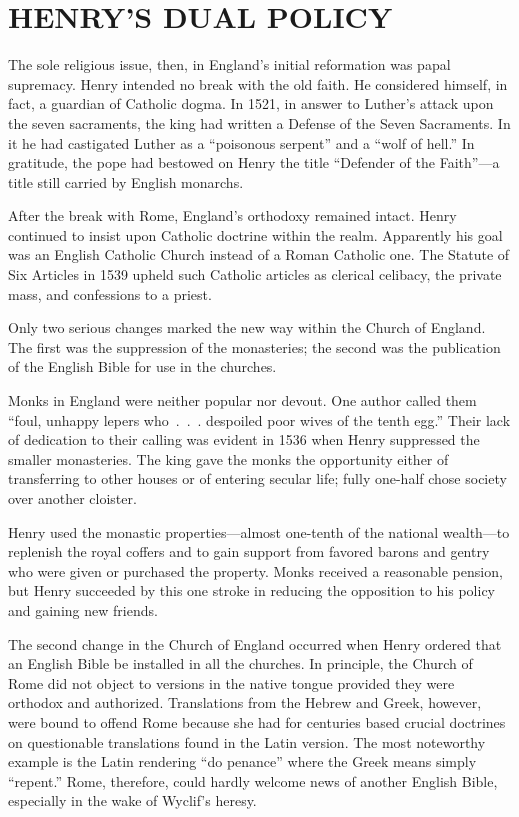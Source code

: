 \section{HENRY’S DUAL POLICY}

The sole religious issue, then, in England’s initial reformation was papal supremacy. Henry intended
no break with the old faith. He considered himself, in fact, a guardian of Catholic dogma. In 1521,
in answer to Luther’s attack upon the seven sacraments, the king had written a Defense of the Seven
Sacraments. In it he had castigated Luther as a “poisonous serpent” and a “wolf of hell.” In
gratitude, the pope had bestowed on Henry the title “Defender of the Faith”—a title still carried by
English monarchs.

After the break with Rome, England’s orthodoxy remained intact. Henry continued to insist upon
Catholic doctrine within the realm. Apparently his goal was an English Catholic Church instead of a
Roman Catholic one. The Statute of Six Articles in 1539 upheld such Catholic articles as clerical
celibacy, the private mass, and confessions to a priest.

Only two serious changes marked the new way within the Church of England. The first was the
suppression of the monasteries; the second was the publication of the English Bible for use in the
churches.

Monks in England were neither popular nor devout. One author called them “foul, unhappy lepers
who~.~.~. despoiled poor wives of the tenth egg.” Their lack of dedication to their calling was
evident in 1536 when Henry suppressed the smaller monasteries. The king gave the monks the
opportunity either of transferring to other houses or of entering secular life; fully one-half chose
society over another cloister.

Henry used the monastic properties—almost one-tenth of the national wealth—to replenish the royal
coffers and to gain support from favored barons and gentry who were given or purchased the property.
Monks received a reasonable pension, but Henry succeeded by this one stroke in reducing the
opposition to his policy and gaining new friends.

The second change in the Church of England occurred when Henry ordered that an English Bible be
installed in all the churches. In principle, the Church of Rome did not object to versions in the
native tongue provided they were orthodox and authorized. Translations from the Hebrew and Greek,
however, were bound to offend Rome because she had for centuries based crucial doctrines on
questionable translations found in the Latin version. The most noteworthy example is the Latin
rendering “do penance” where the Greek means simply “repent.” Rome, therefore, could hardly welcome
news of another English Bible, especially in the wake of Wyclif’s heresy.

